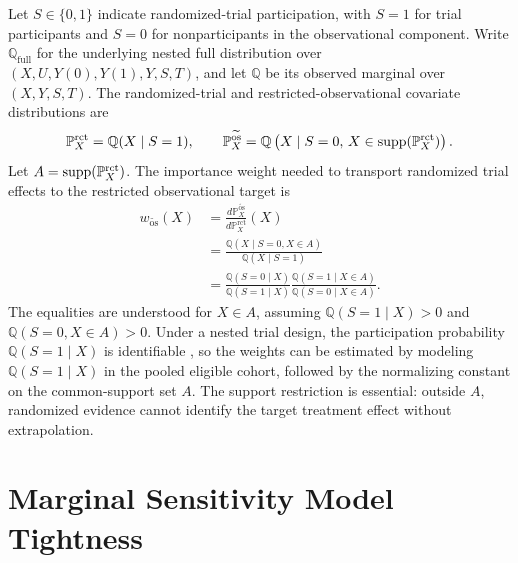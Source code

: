 Let \(S\in\{0,1\}\) indicate randomized-trial participation, with \(S=1\) for trial participants and \(S=0\) for nonparticipants in the observational component. Write \(\mathbb{Q}_{\mathrm{full}}\) for the underlying nested full distribution over \((X,U,Y(0),Y(1),Y,S,T)\), and let \(\mathbb{Q}\) be its observed marginal over \((X,Y,S,T)\). The randomized-trial and restricted-observational covariate distributions are
\[
  \mathbb{P}^{\mathrm{rct}}_X
  =
  \mathbb{Q}(X\mid S=1),
  \qquad
  \mathbb{P}^{\widetilde{\mathrm{os}}}_X
  =
  \mathbb{Q}
  \left(
    X\mid S=0,\,
    X\in\operatorname{supp}(\mathbb{P}^{\mathrm{rct}}_X)
  \right).
\]
Let \(A=\operatorname{supp}(\mathbb{P}^{\mathrm{rct}}_X)\). The importance weight needed to transport randomized trial effects to the restricted observational target is
\[
\begin{aligned}
  w_{\widetilde{\mathrm{os}}}(X)
  &=
  \frac{d\mathbb{P}^{\widetilde{\mathrm{os}}}_X}
       {d\mathbb{P}^{\mathrm{rct}}_X}(X) \\
  &=
  \frac{\mathbb{Q}(X\mid S=0,X\in A)}
       {\mathbb{Q}(X\mid S=1)} \\
  &=
  \frac{\mathbb{Q}(S=0\mid X)}
       {\mathbb{Q}(S=1\mid X)}
  \frac{\mathbb{Q}(S=1\mid X\in A)}
       {\mathbb{Q}(S=0\mid X\in A)}.
\end{aligned}
\]
The equalities are understood for \(X\in A\), assuming \(\mathbb{Q}(S=1\mid X)>0\) and \(\mathbb{Q}(S=0,X\in A)>0\).
Under a nested trial design, the participation probability \(\mathbb{Q}(S=1\mid X)\) is identifiable \citep{dahabreh2021study}, so the weights can be estimated by modeling \(\mathbb{Q}(S=1\mid X)\) in the pooled eligible cohort, followed by the normalizing constant on the common-support set \(A\). The support restriction is essential: outside \(A\), randomized evidence cannot identify the target treatment effect without extrapolation.

\section{Marginal Sensitivity Model Tightness}
\label{app:confounding-msm-tightness}

